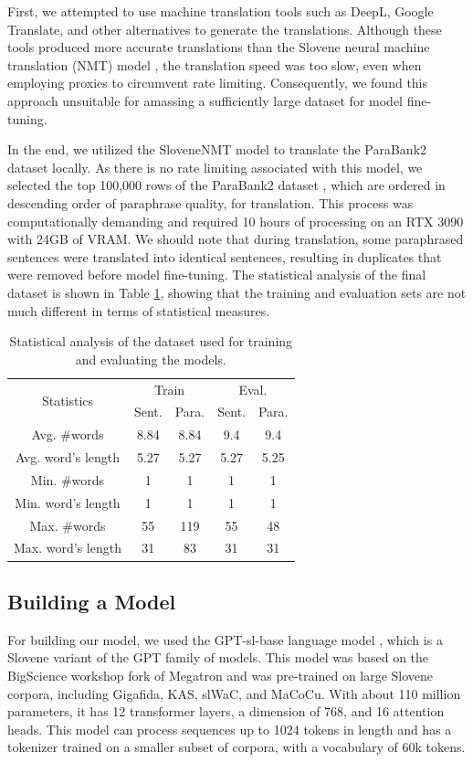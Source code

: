 \documentclass[fleqn,moreauthors,10pt]{ds_report}
\begin{document}
First, we attempted to use machine translation tools such as DeepL, Google Translate, and other alternatives to generate the translations. Although these tools produced more accurate translations than the Slovene neural machine translation (NMT) model \cite{lebar2022neural}, the translation speed was too slow, even when employing proxies to circumvent rate limiting. Consequently, we found this approach unsuitable for amassing a sufficiently large dataset for model fine-tuning.

In the end, we utilized the SloveneNMT model \cite{lebar2022neural} to translate the ParaBank2 dataset locally. As there is no rate limiting associated with this model, we selected the top 100,000 rows of the ParaBank2 dataset \cite{hu2019parabank}, which are ordered in descending order of paraphrase quality, for translation. This process was computationally demanding and required 10 hours of processing on an RTX 3090 with 24GB of VRAM. We should note that during translation, some paraphrased sentences were translated into identical sentences, resulting in duplicates that were removed before model fine-tuning. The statistical analysis of the final dataset is shown in Table \ref{tab:stats}, showing that the training and evaluation sets are not much different in terms of statistical measures.
\begin{table}[!hbt]
    \centering
    \begin{tabular}{|c|c|c|c|c|}
        \hline
        \multirow{2}{*}{Statistics}& \multicolumn{2}{c|}{Train} & \multicolumn{2}{c|}{Eval.}\\
        \cline{2-5}
        & Sent. & Para. & Sent. & Para.\\\hline\hline
        Avg. \#words & 8.84 & 8.84 & 9.4 & 9.4\\
        Avg. word's length & 5.27 & 5.27 & 5.27 & 5.25\\
        Min. \#words & 1 & 1 & 1 & 1\\
        Min. word's length & 1 & 1 & 1 & 1\\
        Max. \#words & 55 & 119 & 55 & 48\\
        Max. word's length & 31 & 83 & 31 & 31\\
        \hline
    \end{tabular}
    \caption{Statistical analysis of the dataset used for training and evaluating the models.}
    \label{tab:stats}
\end{table}

\subsection*{Building a Model}
For building our model, we used the GPT-sl-base language model \cite{huggingface_gptslbase}, which is a Slovene variant of the GPT family of models. This model was based on the BigScience workshop fork of Megatron and was pre-trained on large Slovene corpora, including Gigafida, KAS, slWaC, and MaCoCu. With about 110 million parameters, it has 12 transformer layers, a dimension of 768, and 16 attention heads. This model can process sequences up to 1024 tokens in length and has a tokenizer trained on a smaller subset of corpora, with a vocabulary of 60k tokens.
\end{document}
